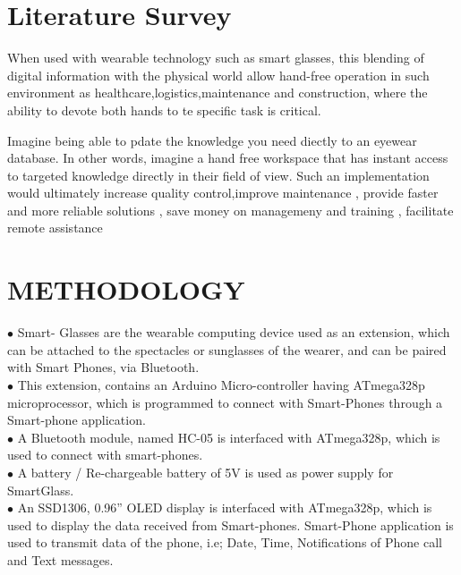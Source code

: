 \documentclass[12pt,a4paper,final,oneside]{report}
\begin{document}
	
	
	
	\newpage
	\chapter{Literature Survey}
	
     	\par When used with wearable technology such as smart glasses, this blending of digital information with the physical world allow hand-free operation in such environment as healthcare,logistics,maintenance and construction, where the ability to devote both hands to te specific task is critical.\\
		\vspace{0.5cm}
        \par Imagine being able to pdate the knowledge you need diectly to an eyewear database. In other words, imagine a hand free workspace that has instant access to targeted knowledge directly in their field of view. Such an implementation would ultimately increase quality control,improve maintenance , provide faster and more reliable solutions , save money on managemeny and training , facilitate remote assistance
	
	
	\newpage
	
	
	
	\chapter{METHODOLOGY}
	
	
	$\bullet$ Smart- Glasses are the wearable computing device used as an extension, which can be attached to the spectacles or sunglasses of the wearer, and can be paired with Smart Phones, via Bluetooth. \\
    $\bullet$ This extension, contains an Arduino Micro-controller having ATmega328p microprocessor, which is programmed to connect with Smart-Phones through a Smart-phone application.\\
	$\bullet$ A Bluetooth module, named HC-05 is interfaced with ATmega328p, which is used to connect with smart-phones. \\
	$\bullet$ A battery / Re-chargeable battery of 5V is used as power supply for SmartGlass.\\
	$\bullet$ An SSD1306, 0.96” OLED display is interfaced with ATmega328p, which is used to display the data received from Smart-phones. Smart-Phone application is used to transmit data of the phone, i.e; Date, Time, Notifications of Phone call and Text messages.
	
\end{document}
